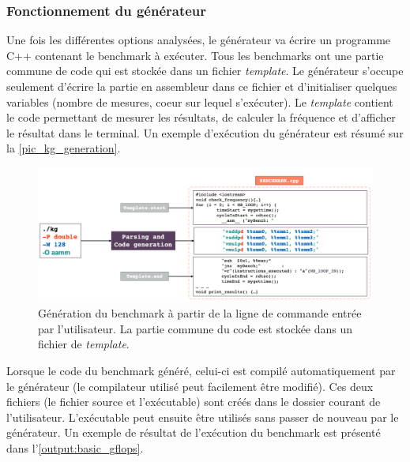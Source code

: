     
    \subsubsection{Fonctionnement du générateur}
        
        Une fois les différentes options analysées, le générateur va écrire un programme C++ contenant le benchmark à exécuter. Tous les benchmarks ont une partie commune de code qui est stockée dans un fichier \textit{template}. Le générateur s'occupe seulement d'écrire la partie en assembleur dans ce fichier et d'initialiser quelques variables (nombre de mesures, coeur sur lequel s'exécuter). Le \textit{template} contient le code permettant de mesurer les résultats, de calculer la fréquence et d'afficher le résultat  dans le terminal. Un exemple d'exécution du générateur est résumé sur la \autoref{pic_kg_generation}. 

        \begin{figure}[h!]
            \center
            \includegraphics[width=14cm]{images/kg_generation.png}
            \caption{\label{pic_kg_generation}Génération du benchmark à partir de la ligne de commande entrée par l'utilisateur. La partie commune du code est stockée dans un fichier de \textit{template}.}
        \end{figure}
        
        Lorsque le code du benchmark généré, celui-ci est compilé automatiquement par le générateur (le compilateur utilisé peut facilement être modifié). Ces deux fichiers (le fichier source et l'exécutable) sont créés dans le dossier courant de l'utilisateur. L'exécutable peut ensuite être utilisés sans passer de nouveau par le générateur. Un exemple de résultat de l'exécution du benchmark est présenté dans l'\autoref{output:basic_gflops}.
    
